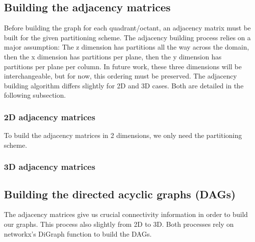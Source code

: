 \subsection{Building the adjacency matrices}

Before building the graph for each quadrant/octant, an adjacency matrix must be built for the given partitioning scheme. 
The adjacency building process relies on a major assumption: The z dimension has partitions all the way across the domain, then the x dimension has partitions per plane, then the y dimension has partitions per plane per column. 
In future work, these three dimensions will be interchangeable, but for now, this ordering must be preserved. The adjacency building algorithm differs slightly for 2D and 3D cases. Both are detailed in the following subsection. 

\subsubsection{2D adjacency matrices}

To build the adjacency matrices in 2 dimensions, we only need the partitioning scheme.

\subsubsection{3D adjacency matrices}

\subsection{Building the directed acyclic graphs (DAGs)}

The adjacency matrices give us crucial connectivity information in order to build our graphs. This process also slightly from 2D to 3D. Both processes rely on networkx's DiGraph function to build the DAGs.


